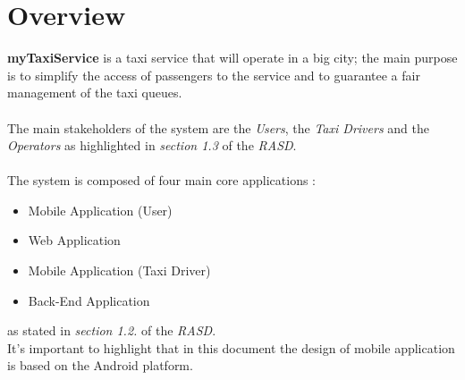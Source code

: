 \section{Overview} %
\label{sec:overview}
\textbf{myTaxiService} is a taxi service that will operate in a big city; the main purpose is to simplify the access of passengers to the service and to guarantee a fair management of the taxi queues.\\\\
The main stakeholders of the system are the \emph{Users}, the \emph{Taxi Drivers} and the \emph{Operators} as highlighted in \emph{section 1.3} of the \emph{RASD}.\\\\
The system is composed of four main core applications :
\begin{itemize}
	\item Mobile Application (User)
	\item Web Application
	\item Mobile Application (Taxi Driver)
	\item Back-End Application
\end{itemize}
 as stated in \emph{section 1.2.} of the \emph{RASD}.\\
 It's important to highlight that in this document the design of mobile application is based on the Android platform.

